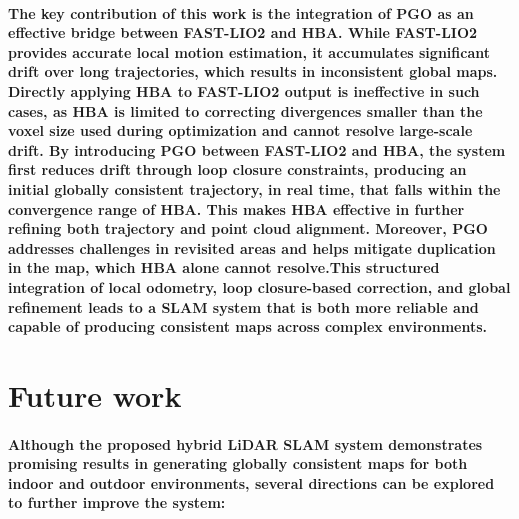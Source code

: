 \paragraph{\textnormal{The key contribution of this work is the integration of PGO as an effective bridge between FAST-LIO2 and HBA. While FAST-LIO2 provides accurate local motion estimation, it accumulates significant drift over long trajectories, which results in inconsistent global maps. Directly applying HBA to FAST-LIO2 output is ineffective in such cases, as HBA is limited to correcting divergences smaller than the voxel size used during optimization and cannot resolve large-scale drift. By introducing PGO between FAST-LIO2 and HBA, the system first reduces drift through loop closure constraints, producing an initial globally consistent trajectory, in real time, that falls within the convergence range of HBA. This makes HBA effective in further refining both trajectory and point cloud alignment. Moreover, PGO addresses challenges in revisited areas and helps mitigate duplication in the map, which HBA alone cannot resolve.This structured integration of local odometry, loop closure-based correction, and global refinement leads to a SLAM system that is both more reliable and capable of producing consistent maps across complex environments.}}

\section{ Future work}
\paragraph{	\textnormal{Although the proposed hybrid LiDAR SLAM system demonstrates promising results in generating globally consistent maps for both indoor and outdoor environments, several directions can be explored to further improve the system:}}
		
